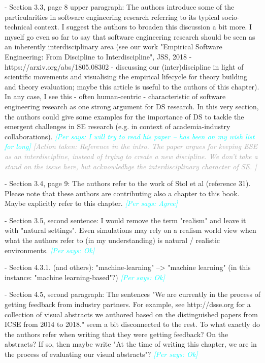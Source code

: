 \documentclass{article}
\newcommand{\per}[1]{\textcolor{cyan}{{\it [Per says: #1]}}}
\newcommand{\action}[1]{\textcolor{darkgray}{{\it [Action taken: #1]}}}
\newcommand{\per}[1]{}
\newcommand{\action}[1]{}
\begin{document}
- Section 3.3, page 8 upper paragraph: The authors introduce some of the particularities in software engineering research referring to its typical socio-technical context. I suggest the authors to broaden this discussion a bit more. I myself go even so far to say that software engineering research should be seen as an inherently interdisciplinary area (see our work "Empirical Software Engineering: From Discipline to Interdiscipline", JSS, 2018 - https://arxiv.org/abs/1805.08302 - discussing our (inter)discipline in light of scientific movements and visualising the empirical lifecycle for theory building and theory evaluation; maybe this article is useful to the authors of this chapter). In any case, I see this - often human-centric - characteristic of software engineering research as one strong argument for DS research. In this very section, the authors could give some examples for the importance of DS to tackle the emergent challenges in SE research (e.g. in context of academia-industry collaborations). \per{I will try to read his paper -- has been on my wish list for long} \action{Reference in the intro. The paper argues for keeping ESE as an interdiscipline, instead of trying to create a new discipline. We don't take a stand on the issue here, but acknowledhge the interdisciplinary character of SE. }

- Section 3.4, page 9: The authors refer to the work of Stol et al (reference 31). Please note that these authors are contributing also a chapter to this book. Maybe explicitly refer to this chapter. \per{Agree}

- Section 3.5, second sentence: I would remove the term "realism" and leave it with "natural settings". Even simulations may rely on a realism world view when what the authors refer to (in my understanding) is natural / realistic environments. \per{Ok}

- Section 4.3.1. (and others): "machine-learning" --> "machine learning" (in this instance: "machine learning-based"?) \per{Ok}

- Section 4.5, second paragraph: The sentences "We are currently in the process of getting feedback from industry partners. For example, see http://dsse.org for a collection of visual abstracts we authored based on the distinguished papers from ICSE from 2014 to 2018." seem a bit disconnected to the rest. To what exactly do the authors refer when writing that they were getting feedback? On the abstracts? If so, then maybe write "At the time of writing this chapter, we are in the process of evaluating our visual abstracts"? \per{Ok}
\end{document}

